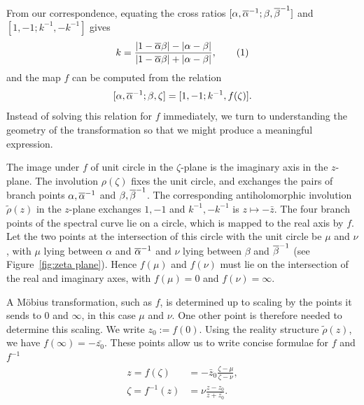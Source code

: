 \documentclass{article}
\begin{document}


From our correspondence, equating the cross ratios $[\alpha,\overline{\alpha}^{-1};\beta,\overline{\beta}^{-1}]$ and\\ $[1,-1;k^{-1},-k^{-1}]$ gives
\[
k = \frac{\abs{1-\bar{\alpha}\beta}-\abs{\alpha-\beta}}{\abs{1-\bar{\alpha}\beta}+\abs{\alpha-\beta}},
\labelthis{eqn:def_k}
\]
and the map $f$ can be computed from the relation
\[
[\alpha,\overline{\alpha}^{-1};\beta,\zeta] = [1,-1;k^{-1},f(\zeta)].
\]
Instead of solving this relation for $f$ immediately, we turn to understanding the geometry of the transformation so that we might produce a meaningful expression.

The image under $f$ of unit circle in the $\zeta$-plane is the imaginary axis in the $z$-plane. The involution $\rho(\zeta)$ fixes the unit circle, and exchanges the pairs of branch points $\alpha,\overline{\alpha}^{-1}$ and $\beta,\overline{\beta}^{-1}$. The corresponding antiholomorphic involution $\tilde{\rho}(z)$ in the $z$-plane exchanges $1,-1$ and $k^{-1},-k^{-1}$ is $z\mapsto -\bar{z}$. The four branch points of the spectral curve lie on a circle, which is mapped to the real axis by $f$. Let the two points at the intersection of this circle with the unit circle be $\mu$ and $\nu$, with $\mu$ lying between $\alpha$ and $\overline{\alpha}^{-1}$ and $\nu$ lying between $\beta$ and $\overline{\beta}^{-1}$ (see Figure~\ref{fig:zeta plane}). Hence $f(\mu)$ and $f(\nu)$ must lie on the intersection of the real and imaginary axes, with $f(\mu) = 0$ and $f(\nu) = \infty$.

A M\"obius transformation, such as $f$, is determined up to scaling by the points it sends to $0$ and $\infty$, in this case $\mu$ and $\nu$. One other point is therefore needed to determine this scaling. We write $z_0 := f(0)$. Using the reality structure $\tilde{\rho}(z)$, we have $f(\infty) = -\bar{z_0}$. These points allow us to write concise formulae for $f$ and $f^{-1}$
\begin{align}
z = f(\zeta) &= -\bar{z}_0 \frac{\zeta - \mu}{\zeta - \nu},
\label{eqn:f} \\
\zeta = f^{-1}(z) &= \nu \frac{z - z_0}{z + \bar{z_0}}.
\label{eqn:f_inv}
\end{align}
\end{document}
